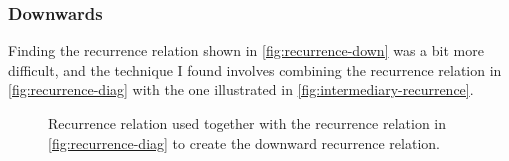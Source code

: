 \documentclass[12pt]{article}
\begin{document}
\subsubsection{Downwards}
Finding the recurrence relation shown in \autoref{fig:recurrence-down} was a bit more difficult, and the technique I found involves combining the recurrence relation in \autoref{fig:recurrence-diag} with the one illustrated in \autoref{fig:intermediary-recurrence}.
\begin{figure}[htbp]
  \centering
  \caption{Recurrence relation used together with the recurrence relation in \autoref{fig:recurrence-diag} to create the downward recurrence relation.}
  \label{fig:intermediary-recurrence}
\end{figure}
\end{document}
